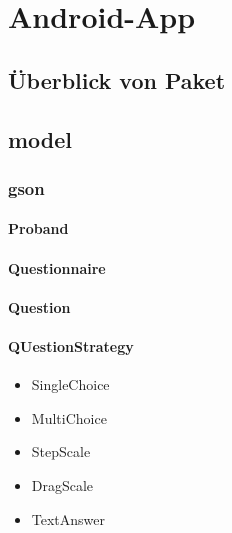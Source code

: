 \documentclass[a4paper]{scrreprt}
\begin{document}
    \newpage
    \chapter{Android-App}

        \section{Überblick von Paket}






        \section{model}

            \subsection{gson}

                \subsubsection{Proband}

                \subsubsection{Questionnaire}

                \subsubsection{Question}

                \subsubsection{QUestionStrategy} %
                    \begin{itemize}
                        \item SingleChoice
                        \item MultiChoice
                        \item StepScale
                        \item DragScale
                        \item TextAnswer
                    \end{itemize}
\end{document}
